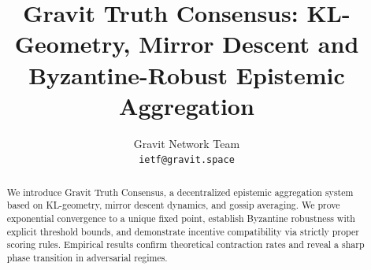 \documentclass[10pt,conference]{IEEEtran}
\title{Gravit Truth Consensus: KL-Geometry, Mirror Descent and Byzantine-Robust Epistemic Aggregation}
\author{
Gravit Network Team \\
\texttt{ietf@gravit.space}
}
\begin{document}
\maketitle

\begin{abstract}
We introduce Gravit Truth Consensus, a decentralized epistemic aggregation system based on KL-geometry, mirror descent dynamics, and gossip averaging. We prove exponential convergence to a unique fixed point, establish Byzantine robustness with explicit threshold bounds, and demonstrate incentive compatibility via strictly proper scoring rules. Empirical results confirm theoretical contraction rates and reveal a sharp phase transition in adversarial regimes.
\end{abstract}











\end{document}
